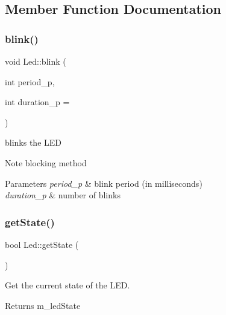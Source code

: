 \subsection{Member Function Documentation}
\mbox{\label{class_led_a5ffc6040a68800545f1d063641cad66d}} 
\subsubsection{\texorpdfstring{blink()}{blink()}}
{\footnotesize\ttfamily void Led\+::blink (\begin{DoxyParamCaption}\item[{int}]{period\+\_\+p,  }\item[{int}]{duration\+\_\+p = {} }\end{DoxyParamCaption})}



blinks the L\+ED 

\begin{DoxyNote}{Note}
blocking method 
\end{DoxyNote}

\begin{DoxyParams}{Parameters}
{\em period\+\_\+p} & blink period (in milliseconds) \\
\hline
{\em duration\+\_\+p} & number of blinks \\
\hline
\end{DoxyParams}
\mbox{\label{class_led_a3c98242eb57df713fcb8d441d43ccd02}} 
\subsubsection{\texorpdfstring{get\+State()}{getState()}}
{\footnotesize\ttfamily bool Led\+::get\+State (\begin{DoxyParamCaption}{ }\end{DoxyParamCaption})}



Get the current state of the L\+ED. 

\begin{DoxyReturn}{Returns}
m\+\_\+led\+State 
\end{DoxyReturn}
\mbox{\label{class_led_a4bce8445a80436df1126471f83b0fb17}} 
